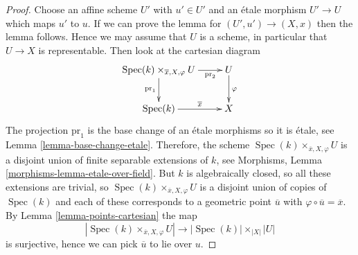\documentclass[10pt,a4paper]{amsart}
\theoremstyle{plain}
\theoremstyle{definition}
\theoremstyle{remark}
\numberwithin{equation}{subsection}
\def\Spec{\mathop{\mathrm{Spec}}}
\begin{document}
\begin{proof}
Choose an affine scheme $U'$ with $u' \in U'$ and an \'etale morphism
$U' \to U$ which maps $u'$ to $u$. If we can prove the lemma for
$(U', u') \to (X, x)$ then the lemma follows. Hence we may assume that
$U$ is a scheme, in particular that $U \to X$ is representable.
Then look at the cartesian diagram
$$
\xymatrix{
\Spec(k) \times_{\overline{x}, X, \varphi} U
\ar[d]_{\text{pr}_1} \ar[r]_-{\text{pr}_2} & U
\ar[d]^\varphi \\
\Spec(k) \ar[r]^-{\overline{x}} & X
}
$$
The projection $\text{pr}_1$ is the base change of an \'etale morphisms
so it is \'etale, see
Lemma \ref{lemma-base-change-etale}.
Therefore, the scheme $\Spec(k) \times_{\overline{x}, X, \varphi} U$
is a disjoint union of finite separable extensions of $k$, see
Morphisms, Lemma \ref{morphisms-lemma-etale-over-field}.
But $k$ is algebraically closed, so all these extensions are trivial,
so $\Spec(k) \times_{\overline{x}, X, \varphi} U$
is a disjoint union of copies of $\Spec(k)$ and each of
these corresponds to a geometric point $\overline{u}$ with
$\varphi \circ \overline{u} = \overline{x}$. By
Lemma \ref{lemma-points-cartesian}
the map
$$
|\Spec(k) \times_{\overline{x}, X, \varphi} U|
\longrightarrow
|\Spec(k)| \times_{|X|} |U|
$$
is surjective, hence we can pick $\overline{u}$ to lie over $u$.
\end{proof}
\end{document}
